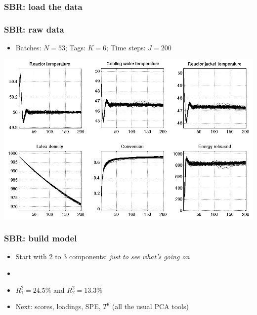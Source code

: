 \begin{frame}\frametitle{SBR: load the data}
	\loaddata
\end{frame}

\begin{frame}\frametitle{SBR: raw data}
	
	\begin{itemize}
		\item	Batches: \( N = 53 \); Tags: \( K = 6 \); Time steps: \( J = 200 \)
		
	\end{itemize}
	
	\begin{center}
		\includegraphics[width=\textwidth]{images/sbr/SBR-raw-data-trajectories.png}
	\end{center}
	{}
\end{frame}

\begin{frame}\frametitle{SBR: build model}
	
	\begin{itemize}
		\item	Start with 2 to 3 components: \emph{just to see what's going on}
		
		\item	{}
		
		\item	\( R^2_1 = 24.5\% \) and \( R^2_2 = 13.3\% \)
		
		\item	Next: scores, loadings, SPE, \( T^2 \) (all the usual PCA tools)
		
	\end{itemize}

\end{frame}

